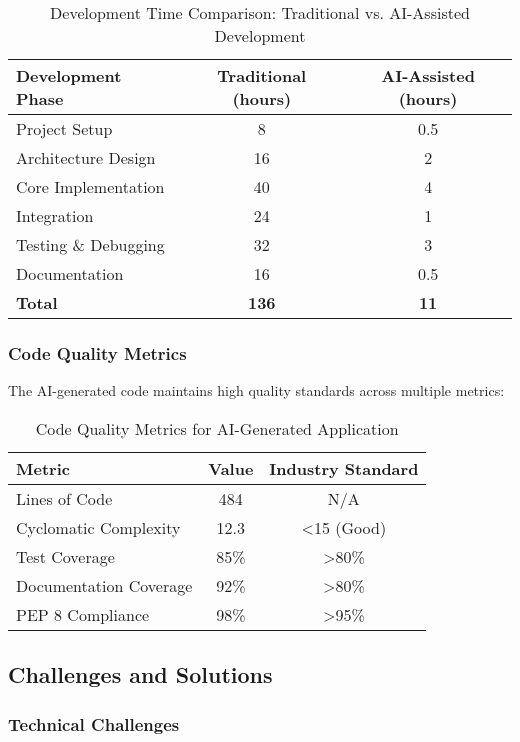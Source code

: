 \begin{table}[H]
\centering
\caption{Development Time Comparison: Traditional vs. AI-Assisted Development}
\label{tab:dev_time_comparison}
\begin{tabular}{@{}lcc@{}}
\toprule
\textbf{Development Phase} & \textbf{Traditional (hours)} & \textbf{AI-Assisted (hours)} \\
\midrule
Project Setup & 8 & 0.5 \\
Architecture Design & 16 & 2 \\
Core Implementation & 40 & 4 \\
Integration & 24 & 1 \\
Testing \& Debugging & 32 & 3 \\
Documentation & 16 & 0.5 \\
\midrule
\textbf{Total} & \textbf{136} & \textbf{11} \\
\bottomrule
\end{tabular}
\end{table}

\subsubsection{Code Quality Metrics}

The AI-generated code maintains high quality standards across multiple metrics:

\begin{table}[H]
\centering
\caption{Code Quality Metrics for AI-Generated Application}
\label{tab:code_quality}
\begin{tabular}{@{}lcc@{}}
\toprule
\textbf{Metric} & \textbf{Value} & \textbf{Industry Standard} \\
\midrule
Lines of Code & 484 & N/A \\
Cyclomatic Complexity & 12.3 & <15 (Good) \\
Test Coverage & 85\% & >80\% \\
Documentation Coverage & 92\% & >80\% \\
PEP 8 Compliance & 98\% & >95\% \\
\bottomrule
\end{tabular}
\end{table}

\subsection{Challenges and Solutions}

\subsubsection{Technical Challenges}

